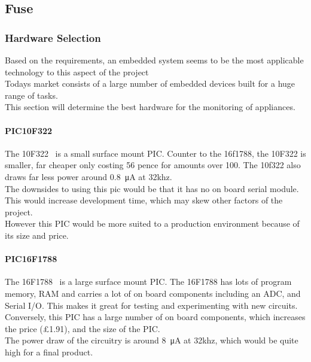 \documentclass[preprint,12pt,3p]{elsarticle}
\begin{document}
\subsection{Fuse}
\subsubsection{Hardware Selection}
Based on the requirements, an embedded system seems to be the most applicable technology to this aspect of the project\\
Todays market consists of a large number of embedded devices built for a huge range of tasks.\\
This section will determine the best hardware for the monitoring of appliances.
\paragraph{PIC10F322}
The 10F322~\cite{10f322} is a small surface mount PIC. Counter to the 16f1788, the 10F322 is smaller, far cheaper only costing 56 pence for amounts over 100.
The 10f322 also draws far less power around \SI{0.8}{\micro\ampere} at 32khz.\\
The downsides to using this pic would be that it has no on board serial module. This would increase development time, which may skew other factors of the project.\\
However this PIC would be more suited to a production environment because of its size and price.

\paragraph{PIC16F1788}
The 16F1788~\cite{16f1788} is a large surface mount PIC. The 16F1788 has lots of program memory, RAM  and carries a lot of on board components including an ADC, and Serial I/O. This makes it great for testing and experimenting with new circuits.\\
Conversely, this PIC has a large number of on board components, which increases the price (\pounds1.91),  and the size of the PIC.\\
The power draw of the circuitry is around \SI{8}{\micro\ampere} at 32khz, which would be quite high for a final product.


\end{document}
